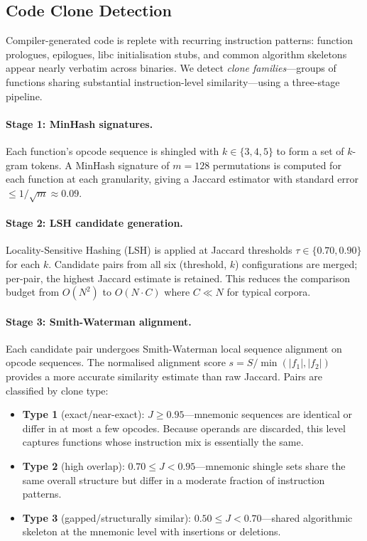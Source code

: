 \documentclass[10pt,twocolumn]{article}
\begin{document}
\subsection{Code Clone Detection}
\label{sec:clone_method}

Compiler-generated code is replete with recurring instruction patterns:
function prologues, epilogues, libc initialisation stubs, and common algorithm
skeletons appear nearly verbatim across binaries.  We detect \emph{clone
families}---groups of functions sharing substantial instruction-level
similarity---using a three-stage pipeline.

\paragraph{Stage 1: MinHash signatures.}
Each function's opcode sequence is shingled with $k \in \{3,4,5\}$ to form a
set of $k$-gram tokens.  A MinHash signature of $m = 128$ permutations is
computed for each function at each granularity, giving a Jaccard estimator
with standard error $\leq 1/\!\sqrt{m} \approx 0.09$.

\paragraph{Stage 2: LSH candidate generation.}
Locality-Sensitive Hashing (LSH) is applied at Jaccard thresholds
$\tau \in \{0.70, 0.90\}$ for each $k$.  Candidate pairs from all six
(threshold, $k$) configurations are merged; per-pair, the highest Jaccard
estimate is retained.  This reduces the comparison budget from
$O(N^2)$ to $O(N \cdot C)$ where $C \ll N$ for typical corpora.

\paragraph{Stage 3: Smith-Waterman alignment.}
Each candidate pair undergoes Smith-Waterman local sequence alignment on
opcode sequences.  The normalised alignment score
$s = S / \min(|f_1|, |f_2|)$ provides a more accurate similarity estimate
than raw Jaccard.  Pairs are classified by clone type:
\begin{itemize}
  \item \textbf{Type 1} (exact/near-exact): $J \geq 0.95$---mnemonic
        sequences are identical or differ in at most a few opcodes.
        Because operands are discarded, this level captures
        functions whose instruction mix is essentially the same.
  \item \textbf{Type 2} (high overlap): $0.70 \leq J < 0.95$---mnemonic
        shingle sets share the same overall structure but differ in a
        moderate fraction of instruction patterns.
  \item \textbf{Type 3} (gapped/structurally similar): $0.50 \leq J < 0.70$---shared
        algorithmic skeleton at the mnemonic level with insertions or
        deletions.
\end{itemize}
\end{document}
